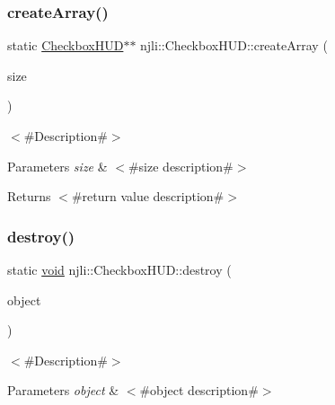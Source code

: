 \subsubsection{\texorpdfstring{create\+Array()}{createArray()}}
{\footnotesize\ttfamily static \mbox{\hyperlink{classnjli_1_1_checkbox_h_u_d}{Checkbox\+H\+UD}}$\ast$$\ast$ njli\+::\+Checkbox\+H\+U\+D\+::create\+Array (\begin{DoxyParamCaption}\item[{const \mbox{\hyperlink{_util_8h_a10e94b422ef0c20dcdec20d31a1f5049}{u32}}}]{size }\end{DoxyParamCaption})\hspace{0.3cm}{\ttfamily [static]}}

$<$\#\+Description\#$>$


\begin{DoxyParams}{Parameters}
{\em size} & $<$\#size description\#$>$\\
\hline
\end{DoxyParams}
\begin{DoxyReturn}{Returns}
$<$\#return value description\#$>$ 
\end{DoxyReturn}
\mbox{\label{classnjli_1_1_checkbox_h_u_d_aa0a2b943e1310f959840e941ff625ba5}} 
\subsubsection{\texorpdfstring{destroy()}{destroy()}}
{\footnotesize\ttfamily static \mbox{\hyperlink{_thread_8h_af1e856da2e658414cb2456cb6f7ebc66}{void}} njli\+::\+Checkbox\+H\+U\+D\+::destroy (\begin{DoxyParamCaption}\item[{\mbox{\hyperlink{classnjli_1_1_checkbox_h_u_d}{Checkbox\+H\+UD}} $\ast$}]{object }\end{DoxyParamCaption})\hspace{0.3cm}{\ttfamily [static]}}

$<$\#\+Description\#$>$


\begin{DoxyParams}{Parameters}
{\em object} & $<$\#object description\#$>$ \\
\hline
\end{DoxyParams}
\mbox{\label{classnjli_1_1_checkbox_h_u_d_a78fec39b7c044f3b42cb16edd1a20f85}} 
